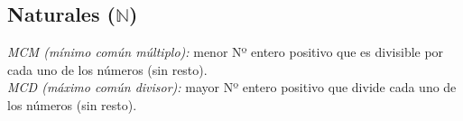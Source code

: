 \subsection{Naturales ($\mathbb{N}$)}
\textit{MCM (mínimo común múltiplo):}
menor Nº  entero positivo que es divisible por cada uno de los números (sin resto).\\

\textit{MCD (máximo común divisor):}
mayor Nº entero positivo que divide cada uno de los números (sin resto).\\
